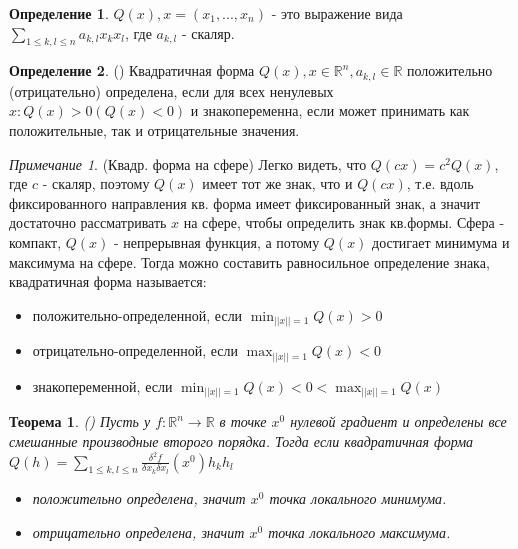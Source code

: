 \documentclass[a4paper]{article}
\theoremstyle{indented}
\newtheorem{theorem}{Теорема}
\theoremstyle{definition}
\newtheorem{defn}{Определение}
\theoremstyle{remark}
\newtheorem{remark}{Примечание}
\begin{document}
\begin{defn}
     $Q(x), x=(x_1, ..., x_n)$ - 
    это выражение вида $\sum\limits_{1 \leq k,l \leq n} a_{k,l} x_k x_l$, где $a_{k,l}$ - скаляр.  
\end{defn}

\begin{defn}
    ()
    Квадратичная форма $Q(x), x\in \mathbb{R}^n, a_{k,l} \in \mathbb{R}$ положительно (отрицательно) определена, если для всех ненулевых $x: Q(x)>0 (Q(x)<0)$
    и знакопеременна, если может принимать как положительные, так и отрицательные значения.
\end{defn}

\begin{remark} (Квадр. форма на сфере)
    Легко видеть, что $Q(cx)=c^2 Q(x)$, где $c$ - скаляр, поэтому $Q(x)$ имеет тот же знак, что и $Q(cx)$,
    т.е. вдоль фиксированного направления кв. форма имеет фиксированный знак, а значит достаточно 
    рассматривать $x$ на сфере, чтобы определить знак кв.формы. Сфера - компакт, $Q(x)$ - непрерывная функция, 
    а потому $Q(x)$ достигает минимума и максимума на сфере. Тогда можно составить равносильное определение
    знака, квадратичная форма называется:
    \begin{itemize}
        \item положительно-определенной, если $ \displaystyle \min_{||x||=1} Q(x) > 0$
        \item отрицательно-определенной, если $ \displaystyle \max_{||x||=1} Q(x) < 0$
        \item знакопеременной, если $ \displaystyle \min_{||x||=1} Q(x) < 0 < \max_{||x||=1} Q(x)$
    \end{itemize}
\end{remark}

\begin{theorem}()
    Пусть у $f: \mathbb{R}^n \to \mathbb{R}$ в точке $x^0$ нулевой градиент и определены все смешанные производные второго порядка.
    Тогда если квадратичная форма
    $Q(h)=\sum\limits_{1 \leq k,l \leq n} \frac{\delta^2 f}{\delta x_k \delta x_l}(x^0) h_k h_l$
    \begin{itemize}
        \item положительно определена, значит $x^0$ точка локального минимума.
        \item отрицательно определена, значит $x^0$ точка локального максимума.
    \end{itemize}
\end{theorem}
\end{document}
